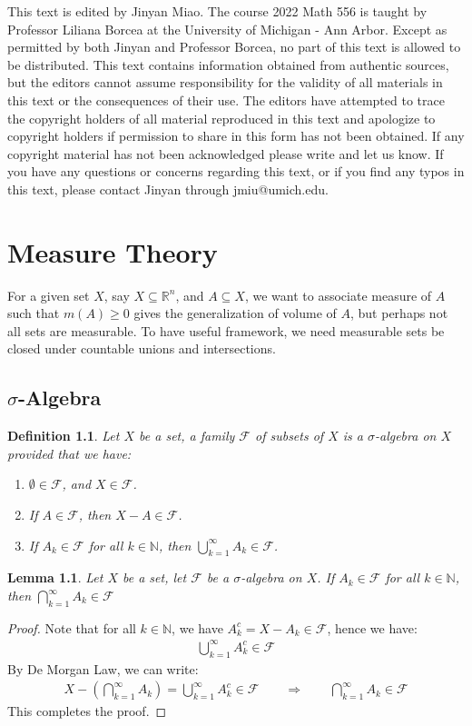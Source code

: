 \documentclass[11pt]{book}
\theoremstyle{break}
\theoremstyle{break}
\newtheorem{lem}{Lemma}[thm]
\newtheorem{defn}{Definition}[corL]
\newcommand{\R}{\mathbb{R}}
\newcommand{\N}{\mathbb{N}}
\newcommand{\F}{\mathcal{F}}
\begin{document}
This text is edited by Jinyan Miao. The course 2022 Math 556 is taught by Professor Liliana Borcea at the University of Michigan - Ann Arbor. Except as permitted by both Jinyan and Professor Borcea, no part of this text is allowed to be distributed. This text contains information obtained from authentic sources, but the editors cannot assume responsibility for the validity of all materials in this text or the consequences of their use. The editors have attempted to trace the copyright holders of all material reproduced in this text and apologize to copyright holders if permission to share in this form has not been obtained. If any copyright material has not been acknowledged please write and let us know. If you have any questions or concerns regarding this text, or if you find any typos in this text, please contact Jinyan through jmiu@umich.edu. 


\newpage
\chapter{Measure Theory}
For a given set $X$, say $X \subseteq \R^n$, and $A \subseteq X$, we want to associate measure of $A$ such that $m(A) \geq 0$ gives the generalization of volume of $A$, but perhaps not all sets are measurable. To have useful framework, we need measurable sets be closed under countable unions and intersections.

\section[$\sigma$-Algebra]{\color{red} $\sigma$-Algebra\color{black}}
\begin{defn}
Let $X$ be a set, a family $\F$ of subsets of $X$ is a $\sigma$-algebra on $X$ provided that we have: 
\begin{enumerate}[topsep=3pt,itemsep=-1ex,partopsep=1ex,parsep=1ex]
\item $\emptyset \in \F$, and $X \in \F$.
\item If $A \in \F$, then $X-A \in \F$.
\item If $A_k \in \F$ for all $k\in \N$, then $\bigcup_{k=1}^\infty A_k \in \F$. 
\end{enumerate}
\end{defn}

\begin{lem}
Let $X$ be a set, let $\F$ be a $\sigma$-algebra on $X$. If $A_k \in \F$ for all $k\in \N$, then $\bigcap_{k=1}^\infty A_k \in \F$
\end{lem}
\begin{proof}
Note that for all $k \in \N$, we have $A_k^c = X - A_k \in \F$, hence we have:
\begin{align*}
\bigcup_{k=1}^\infty A_k^c \in \F
\end{align*}
By De Morgan Law, we can write:
\begin{align*}
X-\left(\bigcap_{k=1}^\infty A_k\right) = \bigcup_{k=1}^\infty A_k^c \in \F \qquad \Rightarrow \qquad \bigcap_{k=1}^\infty A_k  \in \F
\end{align*}
This completes the proof.
\end{proof}
\end{document}
